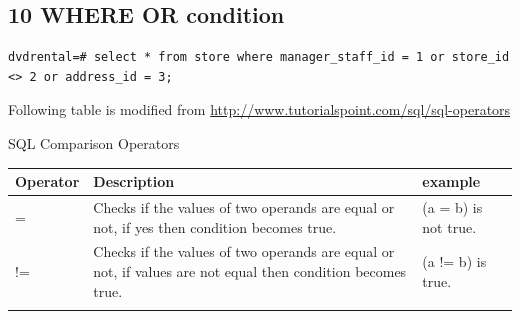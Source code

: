 \documentclass[]{book}
\theoremstyle{definition}
\theoremstyle{definition}
\theoremstyle{definition}
\theoremstyle{remark}
\begin{document}
\hypertarget{where-or-condition}{%
\subsection{10 WHERE OR condition}\label{where-or-condition}}

\begin{verbatim}
dvdrental=# select * from store where manager_staff_id = 1 or store_id <> 2 or address_id = 3; 
\end{verbatim}

Following table is modified from
\url{http://www.tutorialspoint.com/sql/sql-operators}

SQL Comparison Operators

\begin{longtable}[]{@{}lll@{}}
\toprule
\begin{minipage}[b]{0.09\columnwidth}\raggedright
Operator\strut
\end{minipage} & \begin{minipage}[b]{0.69\columnwidth}\raggedright
Description\strut
\end{minipage} & \begin{minipage}[b]{0.13\columnwidth}\raggedright
example\strut
\end{minipage}\tabularnewline
\midrule
\endhead
\begin{minipage}[t]{0.09\columnwidth}\raggedright
=\strut
\end{minipage} & \begin{minipage}[t]{0.69\columnwidth}\raggedright
Checks if the values of two operands are equal or not, if yes then
condition becomes true.\strut
\end{minipage} & \begin{minipage}[t]{0.13\columnwidth}\raggedright
(a = b) is not true.\strut
\end{minipage}\tabularnewline
\begin{minipage}[t]{0.09\columnwidth}\raggedright
!=\strut
\end{minipage} & \begin{minipage}[t]{0.69\columnwidth}\raggedright
Checks if the values of two operands are equal or not, if values are not
equal then condition becomes true.\strut
\end{minipage} & \begin{minipage}[t]{0.13\columnwidth}\raggedright
(a != b) is true.\strut
\end{minipage}\tabularnewline
\begin{minipage}[t]{0.09\columnwidth}\raggedright

\end{minipage}
\end{longtable}
\end{document}
